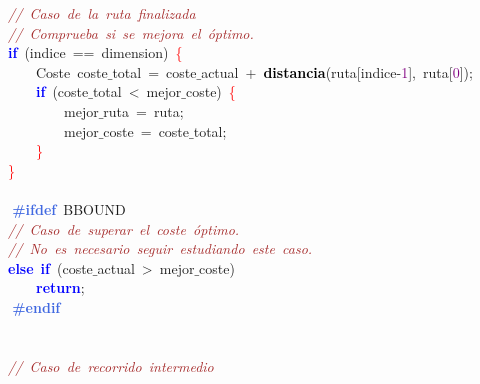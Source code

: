 \mbox{}\ \ \ \ \textit{\textcolor{Brown}{//\ Caso\ de\ la\ ruta\ finalizada}} \\
\mbox{}\ \ \ \ \textit{\textcolor{Brown}{//\ Comprueba\ si\ se\ mejora\ el\ óptimo.\ \ \ \ }} \\
\mbox{}\ \ \ \ \textbf{\textcolor{Blue}{if}}\ \textcolor{BrickRed}{(}indice\ \textcolor{BrickRed}{==}\ dimension\textcolor{BrickRed}{)}\ \textcolor{Red}{\{} \\
\mbox{}\ \ \ \ \ \ \ \ \textcolor{TealBlue}{Coste}\ coste$\_$total\ \textcolor{BrickRed}{=}\ coste$\_$actual\ \textcolor{BrickRed}{+}\ \textbf{\textcolor{Black}{distancia}}\textcolor{BrickRed}{(}ruta\textcolor{BrickRed}{[}indice\textcolor{BrickRed}{-}\textcolor{Purple}{1}\textcolor{BrickRed}{],}\ ruta\textcolor{BrickRed}{[}\textcolor{Purple}{0}\textcolor{BrickRed}{]);} \\
\mbox{}\ \ \ \ \ \ \ \ \textbf{\textcolor{Blue}{if}}\ \textcolor{BrickRed}{(}coste$\_$total\ \textcolor{BrickRed}{\textless{}}\ mejor$\_$coste\textcolor{BrickRed}{)}\ \textcolor{Red}{\{} \\
\mbox{}\ \ \ \ \ \ \ \ \ \ \ \ mejor$\_$ruta\ \textcolor{BrickRed}{=}\ ruta\textcolor{BrickRed}{;} \\
\mbox{}\ \ \ \ \ \ \ \ \ \ \ \ mejor$\_$coste\ \textcolor{BrickRed}{=}\ coste$\_$total\textcolor{BrickRed}{;} \\
\mbox{}\ \ \ \ \ \ \ \ \textcolor{Red}{\}} \\
\mbox{}\ \ \ \ \textcolor{Red}{\}} \\
\mbox{}\ \ \ \  \\
\mbox{}\textbf{\textcolor{RoyalBlue}{\ \ \ \ \#ifdef}}\ BBOUND \\
\mbox{}\ \ \ \ \textit{\textcolor{Brown}{//\ Caso\ de\ superar\ el\ coste\ óptimo.}} \\
\mbox{}\ \ \ \ \textit{\textcolor{Brown}{//\ No\ es\ necesario\ seguir\ estudiando\ este\ caso.}} \\
\mbox{}\ \ \ \ \textbf{\textcolor{Blue}{else}}\ \textbf{\textcolor{Blue}{if}}\ \textcolor{BrickRed}{(}coste$\_$actual\ \textcolor{BrickRed}{\textgreater{}}\ mejor$\_$coste\textcolor{BrickRed}{)} \\
\mbox{}\ \ \ \ \ \ \ \ \textbf{\textcolor{Blue}{return}}\textcolor{BrickRed}{;} \\
\mbox{}\textbf{\textcolor{RoyalBlue}{\ \ \ \ \#endif}} \\
\mbox{}\ \ \ \  \\
\mbox{} \\
\mbox{}\ \ \ \ \textit{\textcolor{Brown}{//\ Caso\ de\ recorrido\ intermedio}} \\
